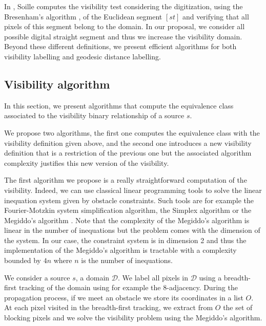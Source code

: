 \documentclass[fleqn,twoside]{article}
\begin{document}
In \cite{soille91,soille94,soillebook}, Soille computes the visibility test
considering the digitization, using the Bresenham's algorithm
\cite{bres65}, of the Euclidean segment $[st]$ and verifying that all
pixels of this segment belong to the domain. In our proposal, we
consider all possible digital straight segment and thus we increase
the visibility domain. Beyond these different definitions, we present
efficient algorithms for both visibility labelling and geodesic
distance labelling.


\subsection{Visibility algorithm}

In  this section, we  present algorithms that  compute the equivalence
class  associated to  the visibility binary  relationship  of a source
$s$.

We propose two   algorithms, the first  one   computes the equivalence
class with the  visibility definition given above,  and the second one
introduces a new visibility definition  that  is a restriction of  the
previous  one but the associated  algorithm  complexity justifies this
new version of the visibility.

The first algorithm we propose is a really straightforward computation
of the  visibility. Indeed,  we can  use classical linear  programming
tools  to solve   the   linear inequation  system    given by obstacle
constraints.    Such  tools are    for   example  the  Fourier-Motzkin
\cite{fourier} system simplification algorithm, the Simplex algorithm
or the Megiddo's algorithm \cite{megiddo}.   Note that the complexity
of the Megiddo's algorithm is linear in  the number of inequations but
the problem comes with the dimension of  the system.  In our case, the
constraint system is in dimension 2 and thus the implementation of the
Megiddo's algorithm is tractable  with  a complexity bounded  by  $4n$
where $n$ is the number of inequations.

We consider a source $s$, a  domain $\mathcal{D}$. We label all pixels
in $\mathcal{D}$  using a breadth-first tracking   of the domain using
for  example the 8-adjacency.  During the  propagation process, if  we
meet an obstacle we store its coordinates in a list $O$. At each pixel
visited in the breadth-first tracking, we  extract from $O$ the set of
blocking pixels and    we  solve the  visibility problem    using  the
Megiddo's algorithm.
\end{document}
